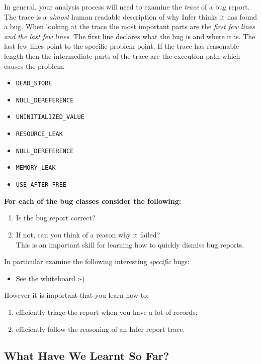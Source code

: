 In general, your analysis process will need to examine the \textit{trace} of a bug report.
The trace is a \textit{almost} human readable description of why Infer thinks it has found a bug.
When looking at the trace the most important parts are the \textit{first few lines and the last few lines}. The first line declares what the bug is and where it is. 
The last few lines point to the specific problem point. 
If the trace has reasonable length then the intermediate parts of the trace 
are the execution path which causes the problem. 


\begin{itemize}
	\itemsep0em
	\item \verb|DEAD_STORE|
	\item \verb|NULL_DEREFERENCE|
	\item \verb|UNINITIALIZED_VALUE|
	\item \verb|RESOURCE_LEAK|
	\item \verb|NULL_DEREFERENCE|
	\item \verb|MEMORY_LEAK|
	\item \verb|USE_AFTER_FREE|
\end{itemize}

\textbf{For each of the bug classes consider the following:}
\begin{enumerate}
	\item Is the bug report correct?
	\item If not, can you think of a reason why it failed? \\
	This is an important skill for learning how to quickly dismiss bug reports.
\end{enumerate}


In particular examine the following interesting \textit{specific} bugs:
\begin{itemize}
    \item See the whiteboard :-)
\end{itemize}


However it is important that you learn how to:
\begin{enumerate}
	\item efficiently triage the report when you have a lot of records;
	\item efficiently follow the reasoning of an Infer report trace. 
\end{enumerate}

\subsection{What Have We Learnt So Far?}

